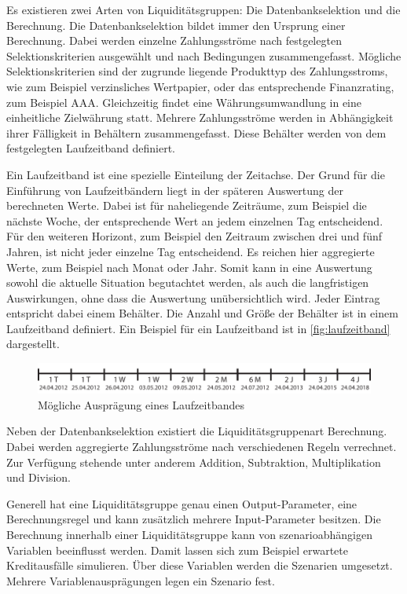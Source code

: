 \begin{onehalfspacing}
Es existieren zwei Arten von Liquiditätsgruppen: Die Datenbankselektion und die Berechnung. Die Datenbankselektion bildet immer den Ursprung einer Berechnung. Dabei werden einzelne Zahlungsströme nach festgelegten Selektionskriterien ausgewählt und nach Bedingungen zusammengefasst. Mögliche Selektionskriterien sind der zugrunde liegende Produkttyp des Zahlungsstroms, wie zum Beispiel verzinsliches Wertpapier, oder das entsprechende Finanzrating, zum Beispiel AAA. Gleichzeitig findet eine Währungsumwandlung in eine einheitliche Zielwährung statt. Mehrere Zahlungsströme werden in Abhängigkeit ihrer Fälligkeit in Behältern zusammengefasst. Diese Behälter werden von dem festgelegten Laufzeitband definiert.

Ein Laufzeitband ist eine spezielle Einteilung der Zeitachse. Der Grund für die Einführung von Laufzeitbändern liegt in der späteren Auswertung der berechneten Werte. Dabei ist für naheliegende Zeiträume, zum Beispiel die nächste Woche, der entsprechende Wert an jedem einzelnen Tag entscheidend. Für den weiteren Horizont, zum Beispiel den Zeitraum zwischen drei und fünf Jahren, ist nicht jeder einzelne Tag entscheidend. Es reichen hier aggregierte Werte, zum Beispiel nach Monat oder Jahr. Somit kann in eine Auswertung sowohl die aktuelle Situation begutachtet werden, als auch die langfristigen Auswirkungen, ohne dass die Auswertung unübersichtlich wird. Jeder Eintrag entspricht dabei einem Behälter. Die Anzahl und Größe der Behälter ist in einem Laufzeitband definiert. Ein Beispiel für ein Laufzeitband ist in \vref{fig:laufzeitband} dargestellt.

\begin{figure}[ht]
\centering
\setlength{\unitlength}{1mm}
\includegraphics[width=15cm]{images/Abbildung4-Laufzeitband.pdf}
\caption{Mögliche Ausprägung eines Laufzeitbandes\label{fig:laufzeitband}}
\end{figure}

Neben der Datenbankselektion existiert die Liquiditätsgruppenart Berechnung. Dabei werden aggregierte Zahlungsströme nach verschiedenen Regeln verrechnet. Zur Verfügung stehende unter anderem Addition, Subtraktion, Multiplikation und Division. 

Generell hat eine Liquiditätsgruppe genau einen Output-Parameter, eine Berechnungsregel und kann zusätzlich mehrere Input-Parameter besitzen. Die Berechnung innerhalb einer Liquiditätsgruppe kann von szenarioabhängigen Variablen beeinflusst werden. Damit lassen sich zum Beispiel erwartete Kreditausfälle simulieren. Über diese Variablen werden die Szenarien umgesetzt. Mehrere Variablenausprägungen legen ein Szenario fest.


\end{onehalfspacing}
